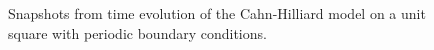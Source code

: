 \documentclass{article} %
\begin{document}
\begin{figure}[!h]
    \caption{Snapshots from time evolution of the Cahn-Hilliard model on a unit square with periodic boundary conditions.}
    \label{fig:time-evolution}    
\end{figure}





\printbibliography
\end{document}
